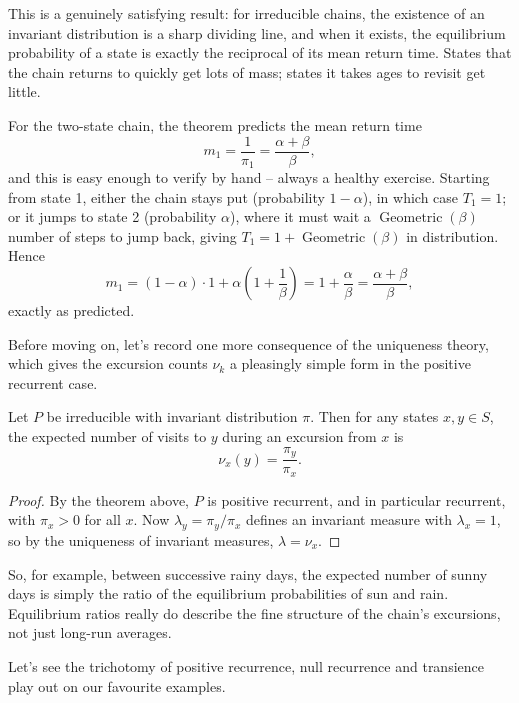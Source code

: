 \documentclass[a4paper]{scrartcl}
\begin{document}
This is a genuinely satisfying result: for irreducible chains, the existence of an invariant distribution is a sharp dividing line, and when it exists, the equilibrium probability of a state is exactly the reciprocal of its mean return time. States that the chain returns to quickly get lots of mass; states it takes ages to revisit get little.

\begin{example}
	For the two-state chain, the theorem predicts the mean return time
	$$
	m_1 = \frac{1}{\pi_1} = \frac{\alpha + \beta}{\beta},
	$$
	and this is easy enough to verify by hand -- always a healthy exercise. Starting from state 1, either the chain stays put (probability $1 - \alpha$), in which case $T_1 = 1$; or it jumps to state 2 (probability $\alpha$), where it must wait a $\operatorname{Geometric}(\beta)$ number of steps to jump back, giving $T_1 = 1 + \operatorname{Geometric}(\beta)$ in distribution. Hence
	$$
	m_1 = (1 - \alpha) \cdot 1 + \alpha \left(1 + \frac{1}{\beta}\right) = 1 + \frac{\alpha}{\beta} = \frac{\alpha + \beta}{\beta},
	$$
	exactly as predicted.
\end{example}

Before moving on, let's record one more consequence of the uniqueness theory, which gives the excursion counts $\nu_k$ a pleasingly simple form in the positive recurrent case.

\begin{corollary}
	Let $P$ be irreducible with invariant distribution $\pi$. Then for any states $x, y \in S$, the expected number of visits to $y$ during an excursion from $x$ is
	$$
	\nu_x(y) = \frac{\pi_y}{\pi_x}.
	$$
\end{corollary}
\begin{proof}
	By the theorem above, $P$ is positive recurrent, and in particular recurrent, with $\pi_x > 0$ for all $x$. Now $\lambda_y = \pi_y / \pi_x$ defines an invariant measure with $\lambda_x = 1$, so by the uniqueness of invariant measures, $\lambda = \nu_x$.
\end{proof}

So, for example, between successive rainy days, the expected number of sunny days is simply the ratio of the equilibrium probabilities of sun and rain. Equilibrium ratios really do describe the fine structure of the chain's excursions, not just long-run averages.

Let's see the trichotomy of positive recurrence, null recurrence and transience play out on our favourite examples.
\end{document}

